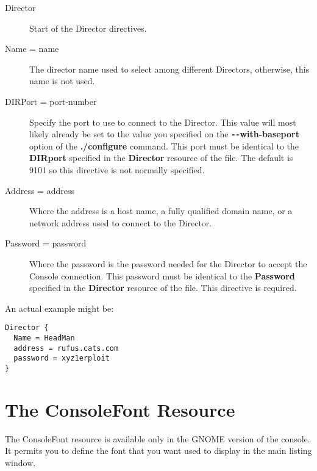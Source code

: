 \begin{description}
\item [Director]
   Start of the Director directives.

\item [Name = \lt{}name\gt{}]
   The director name used to select  among different Directors, otherwise, this
   name is not used. 

\item [DIRPort = \lt{}port-number\gt{}]
   Specify the port to use to connect  to the Director. This value will most
   likely already be set to the value  you specified on the {\bf
   \verb:--:with-baseport} option of the  {\bf ./configure} command. This port must be
   identical to the  {\bf DIRport} specified in the {\bf Director} resource of
   the  file.  The
   default is 9101 so this directive is not normally specified. 

\item [Address = \lt{}address\gt{}]
   Where the address is a host name,  a fully qualified domain name, or a network
   address used to connect  to the Director. 

\item [Password = \lt{}password\gt{}]
   Where the password is the  password needed for the Director to accept the
   Console connection.  This password must be identical to the {\bf Password}
   specified in  the {\bf Director} resource of the 
    file. This 
   directive is required. 
\end{description}

An actual example might be: 

\footnotesize
\begin{verbatim}
Director {
  Name = HeadMan
  address = rufus.cats.com
  password = xyz1erploit
}
\end{verbatim}
\normalsize

\section{The ConsoleFont Resource}

The ConsoleFont resource is available only in the GNOME version of the
console. It permits you to define the font that you want used to display in
the main listing window. 

